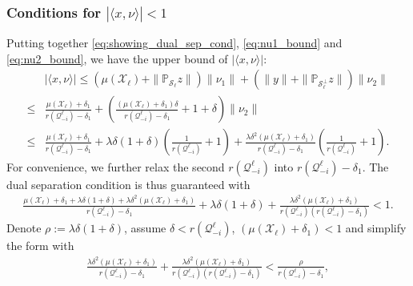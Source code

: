 \documentclass[twoside,11pt]{article}
\numberwithin{equation}{section}
\begin{document}
\subsubsection{Conditions for  \texorpdfstring{$|\langle x, \nu \rangle|<1$}{|<x,nu>|}}
Putting together \eqref{eq:showing_dual_sep_cond}, \eqref{eq:nu1_bound} and \eqref{eq:nu2_bound}, we have the upper bound of $|\langle x, \nu \rangle|$:
\begin{equation*}
\begin{aligned}
    &|\langle x, \nu \rangle| \leq (\mu(\mathcal{X}_{\ell})+\|\mathbb{P}_{\mathcal{S}_{\ell}}z\|) \|\nu_1\| + (\|y\|+\|\mathbb{P}_{\mathcal{S}_{\ell}^{\perp}}z\|)\|\nu_2\|\\
    \leq&\frac{\mu(\mathcal{X}_{\ell})+\delta_1}{r{\left( \mathcal{Q}_{-i}^{\ell}\right)}-\delta_1} + \left(\frac{(\mu(\mathcal{X}_{\ell})+\delta_1)\delta}{r{\left( \mathcal{Q}_{-i}^{\ell}\right)}-\delta_1}+1+\delta\right)\|\nu_2\|\\
    \leq& \frac{\mu(\mathcal{X}_{\ell})+\delta_1}{r{\left( \mathcal{Q}_{-i}^{\ell}\right)}-\delta_1} + \lambda\delta(1+\delta) \left(\frac{1}{r(\mathcal{Q}_{-i}^{\ell})}+1\right)
    + \frac{\lambda\delta^2(\mu(\mathcal{X}_{\ell})+\delta_1)}{r{\left( \mathcal{Q}_{-i}^{\ell}\right)}-\delta_1}\left(\frac{1}{r(\mathcal{Q}_{-i}^{\ell})}+1\right).
\end{aligned}
\end{equation*}
For convenience, we further relax the second $r(\mathcal{Q}_{-i}^{\ell})$ into $r(\mathcal{Q}_{-i}^{\ell})-\delta_1$. The dual separation condition is thus guaranteed with
\begin{align*}
    \frac{\mu(\mathcal{X}_{\ell})+\delta_1 +\lambda\delta(1+\delta)+\lambda\delta^2(\mu(\mathcal{X}_{\ell})+\delta_1)}{r{\left( \mathcal{Q}_{-i}^{\ell}\right)}-\delta_1}
    + \lambda\delta(1+\delta)+\frac{\lambda\delta^2(\mu(\mathcal{X}_{\ell})+\delta_1)}{r{\left( \mathcal{Q}_{-i}^{\ell}\right)}(r{\left( \mathcal{Q}_{-i}^{\ell}\right)}-\delta_1)}  < 1.
\end{align*}
Denote $\rho:=\lambda\delta(1+\delta)$, assume $\delta<r{\left( \mathcal{Q}_{-i}^{\ell}\right)}$, $(\mu(\mathcal{X}_{\ell})+\delta_1)<1$ and simplify the form with
\begin{align*}
\frac{\lambda\delta^2(\mu(\mathcal{X}_{\ell})+\delta_1)}{r{\left( \mathcal{Q}_{-i}^{\ell}\right)}-\delta_1}+\frac{\lambda\delta^2(\mu(\mathcal{X}_{\ell})+\delta_1)}{r{\left( \mathcal{Q}_{-i}^{\ell}\right)}(r{\left( \mathcal{Q}_{-i}^{\ell}\right)}-\delta_1)}
< \frac{\rho}{r{\left( \mathcal{Q}_{-i}^{\ell}\right)}-\delta_1},
\end{align*}
\end{document}
